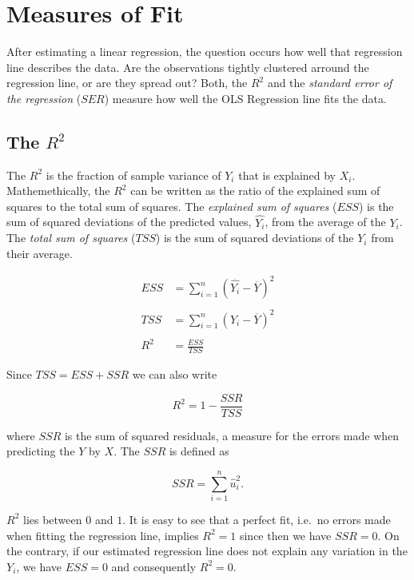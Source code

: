\documentclass[]{book}
\theoremstyle{definition}
\theoremstyle{definition}
\theoremstyle{definition}
\theoremstyle{remark}
\begin{document}
\section{Measures of Fit}\label{measures-of-fit}

After estimating a linear regression, the question occurs how well that
regression line describes the data. Are the observations tightly
clustered arround the regression line, or are they spread out? Both, the
\(R^2\) and the \emph{standard error of the regression} (\(SER\))
measure how well the OLS Regression line fits the data.

\subsection*{\texorpdfstring{The \(R^2\)}{The R\^{}2}}\label{the-r2}

The \(R^2\) is the fraction of sample variance of \(Y_i\) that is
explained by \(X_i\). Mathemethically, the \(R^2\) can be written as the
ratio of the explained sum of squares to the total sum of squares. The
\emph{explained sum of squares} (\(ESS\)) is the sum of squared
deviations of the predicted values, \(\hat{Y_i}\), from the average of
the \(Y_i\). The \emph{total sum of squares} (\(TSS\)) is the sum of
squared deviations of the \(Y_i\) from their average.

\begin{align}
  ESS & =  \sum_{i = 1}^n \left( \hat{Y_i} - \overline{Y} \right)^2   \\
  \\
  TSS & =  \sum_{i = 1}^n \left( Y_i - \overline{Y} \right)^2   \\
  \\
  R^2 & = \frac{ESS}{TSS}
\end{align}

Since \(TSS = ESS + SSR\) we can also write

\[ R^2 = 1- \frac{SSR}{TSS} \]

where \(SSR\) is the sum of squared residuals, a measure for the errors
made when predicting the \(Y\) by \(X\). The \(SSR\) is defined as

\[ SSR = \sum_{i=1}^n \hat{u}_i^2. \]

\(R^2\) lies between \(0\) and \(1\). It is easy to see that a perfect
fit, i.e.~no errors made when fitting the regression line, implies
\(R^2 = 1\) since then we have \(SSR=0\). On the contrary, if our
estimated regression line does not explain any variation in the \(Y_i\),
we have \(ESS=0\) and consequently \(R^2=0\).
\end{document}
